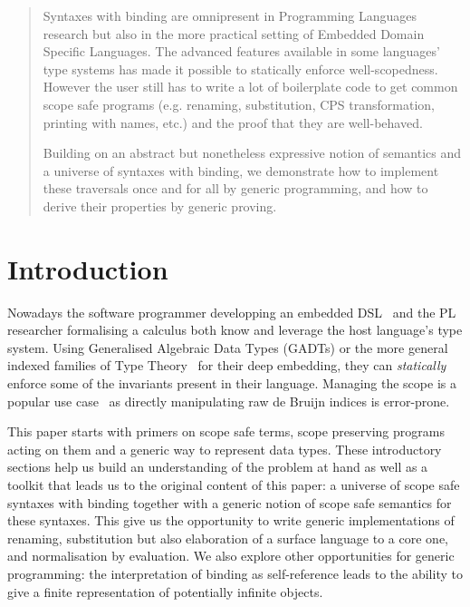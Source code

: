\begin{abstract}
Syntaxes with binding are omnipresent in Programming Languages
research but also in the more practical setting of Embedded
Domain Specific Languages. The advanced features available in
some languages' type systems has made it possible to statically
enforce well-scopedness. However the user still has to write a
lot of boilerplate code to get common scope safe programs (e.g.
renaming, substitution, CPS transformation, printing with names,
etc.) and the proof that they are well-behaved.

Building on an abstract but nonetheless expressive notion of
semantics and a universe of syntaxes with binding, we demonstrate
how to implement these traversals once and for all by generic
programming, and how to derive their properties by generic proving.
\end{abstract}

\section{Introduction}

Nowadays the software programmer developping an embedded DSL~\cite{hudak1996building}
and the PL researcher formalising a calculus both know and
leverage the host language's type system. Using Generalised
Algebraic Data Types (GADTs) or the more general indexed
families of Type Theory~\cite{dybjer1994inductive} for their deep embedding, they can
\emph{statically} enforce some of the invariants present in
their language. Managing the scope is a popular use case~\cite{altenkirch1999monadic} as
directly manipulating raw de Bruijn indices is error-prone.

This paper starts with primers on scope safe terms, scope preserving
programs acting on them and a generic way to represent data types.
These introductory sections help us build an understanding of the
problem at hand as well as a toolkit that leads us to the original
content of this paper: a universe of scope safe syntaxes with binding
together with a generic notion of scope safe semantics for these syntaxes.
This give us the opportunity to write generic implementations of renaming,
substitution but also elaboration of a surface language to a core one,
and normalisation by evaluation. We also explore other opportunities for
generic programming: the interpretation of binding as self-reference leads
to the ability to give a finite representation of potentially infinite
objects.

